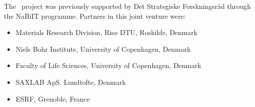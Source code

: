 The \MCX\ project was previously supported by Det Strategiske Forskningsråd through the NaBiIT programme. Partners in this joint venture were: 
\begin{itemize}
\item Materials Research Division, Risø DTU, Roskilde, Denmark\\
\item Niels Bohr Institute, University of Copenhagen, Denmark\\
\item Faculty of Life Sciences, University of Copenhagen, Denmark\\
\item SAXLAB ApS. Lundtofte, Denmark\\
\item ESRF, Grenoble, France
\end{itemize}
